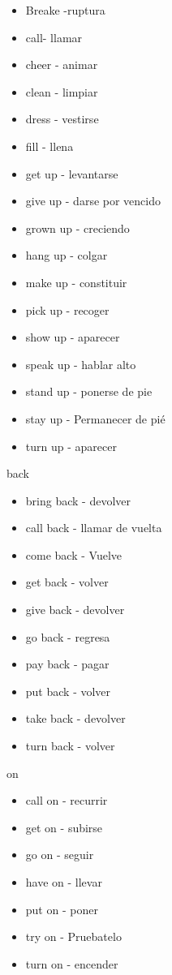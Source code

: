 \documentclass{article}
\begin{document}
    \begin{itemize}
        \item Breake -ruptura
        \item call- llamar 
        \item cheer - animar 
        \item clean - limpiar 
        \item dress - vestirse 
        \item fill - llena 
        \item get up  - levantarse 
        \item give up     - darse por vencido
        \item grown up  - creciendo
        \item hang up - colgar
        \item make up - constituir
        \item pick up  - recoger
        \item show up  - aparecer
        \item speak up - hablar alto
        \item stand up  - ponerse de pie
        \item stay up - Permanecer de pié
        \item turn up - aparecer
    \end{itemize}
    back 
    \begin{itemize}
        \item bring back  - devolver
        \item call back - llamar de vuelta
        \item come back  - Vuelve
        \item get back  - volver
        \item give back  - devolver
        \item go back  - regresa
        \item pay back  - pagar
        \item put back  - volver
        \item take back  - devolver
        \item turn back - volver
    \end{itemize}
    on 
    \begin{itemize}
        \item call on  - recurrir
        \item get on  - subirse
        \item go on  - seguir
        \item have on  - llevar
        \item put on  - poner
        \item try on  - Pruebatelo
        \item turn on  - encender
    \end{itemize}
    
\end{document}
